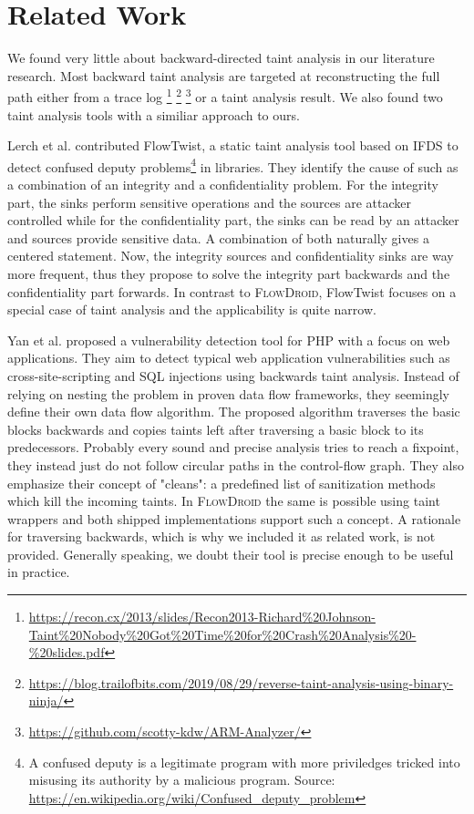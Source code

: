 \documentclass[../draft.tex]{subfiles}
\begin{document}
    \chapter{Related Work}
    We found very little about backward-directed taint analysis in our literature research. Most backward taint analysis are targeted at reconstructing the full path either from a trace log%
    \footnote{\url{https://recon.cx/2013/slides/Recon2013-Richard\%20Johnson-Taint\%20Nobody\%20Got\%20Time\%20for\%20Crash\%20Analysis\%20-\%20slides.pdf}}
    \footnote{\url{https://blog.trailofbits.com/2019/08/29/reverse-taint-analysis-using-binary-ninja/}}
    \footnote{\url{https://github.com/scotty-kdw/ARM-Analyzer/}}
    or a taint analysis result\cite{Ferrara2020}. 
    We also found two taint analysis tools with a similiar approach to ours.

    Lerch et al.\cite{Lerch2014} contributed FlowTwist, a static taint analysis tool based on IFDS to detect confused deputy problems\footnote{A confused deputy is a legitimate program with more priviledges tricked into misusing its authority by a malicious program. Source: \url{https://en.wikipedia.org/wiki/Confused_deputy_problem}} in libraries. They identify the cause of such as a combination of an integrity and a confidentiality problem. For the integrity part, the sinks perform sensitive operations and the sources are attacker controlled while for the confidentiality part, the sinks can be read by an attacker and sources provide sensitive data. A combination of both naturally gives a centered statement. Now, the integrity sources and confidentiality sinks are way more frequent, thus they propose to solve the integrity part backwards and the confidentiality part forwards. In contrast to \textsc{FlowDroid}, FlowTwist focuses on a special case of taint analysis and the applicability is quite narrow. 

    Yan et al.\cite{Yan2017} proposed a vulnerability detection tool for PHP with a focus on web applications. They aim to detect typical web application vulnerabilities such as cross-site-scripting and SQL injections using backwards taint analysis. 
    Instead of relying on nesting the problem in proven data flow frameworks, they seemingly define their own data flow algorithm. The proposed algorithm traverses the basic blocks backwards and copies taints left after traversing a basic block to its predecessors. Probably every sound and precise analysis tries to reach a fixpoint, they instead just do not follow circular paths in the control-flow graph. 
    They also emphasize their concept of "cleans": a predefined list of sanitization methods which kill the incoming taints. 
    In \textsc{FlowDroid} the same is possible using taint wrappers and both shipped implementations support such a concept.
    A rationale for traversing backwards, which is why we included it as related work, is not provided. Generally speaking, we doubt their tool is precise enough to be useful in practice.
\end{document}
